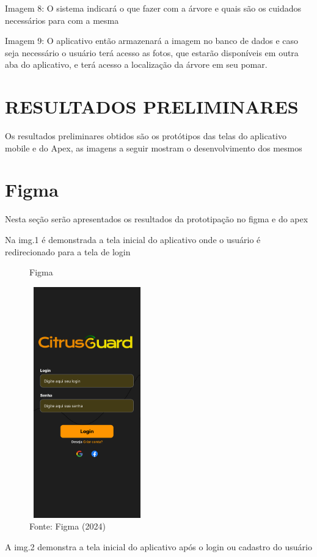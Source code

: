 \documentclass[
  a4paper,%
  12pt,%
  english,%
  brazilian,%
]{article}
\begin{document}
Imagem 8: O sistema indicará o que fazer com a árvore e quais são os cuidados necessários para com a mesma

Imagem 9: O aplicativo então armazenará a imagem no banco de dados e caso seja necessário o usuário terá acesso as fotos, que estarão disponíveis em outra aba do aplicativo, e terá acesso a localização da árvore em seu pomar. \label{sect:metodologia}



\section*{RESULTADOS PRELIMINARES}Os resultados preliminares obtidos são os protótipos das telas do aplicativo mobile e do Apex, as imagens a seguir mostram o desenvolvimento dos mesmos

\section*{Figma}
Nesta seção serão apresentados os resultados da prototipação no figma e do apex

Na img.1 é demonstrada a tela inicial do aplicativo onde o usuário é redirecionado para a tela
de login

\begin{figure}[H]
    \centering
    \caption*{Figma}
    \includegraphics[width=5cm,height=10cm]{Illustrations/figma1.png}
    \caption*{Fonte: Figma (2024)}
    \label{fig:enter-label}
\end{figure}

A img.2 demonstra a tela inicial do aplicativo após o login ou cadastro do usuário
\end{document}
